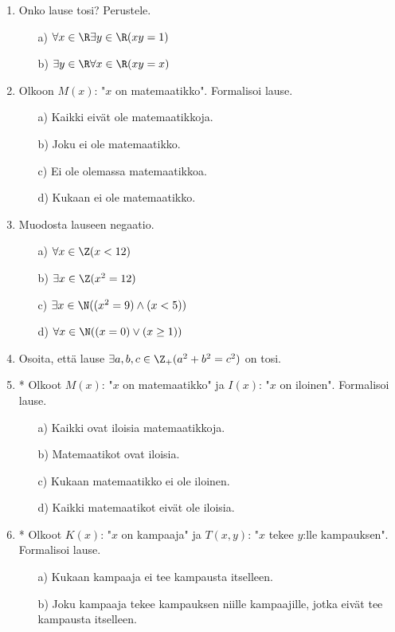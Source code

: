 \begin{enumerate}
\item Onko lause tosi? Perustele.
\begin{itemize}
\item[a)] $\forall x\in \R\exists y\in \R (xy=1)$
\item[b)] $\exists y\in \R\forall x\in \R (xy =x)$
\end{itemize}

\item Olkoon $M(x)$: "$x$ on matemaatikko". Formalisoi lause.

\begin{itemize}
\item[a)] Kaikki eivät ole matemaatikkoja.
\item[b)] Joku ei ole matemaatikko.
\item[c)] Ei ole olemassa matemaatikkoa.
\item[d)] Kukaan ei ole matemaatikko.
\end{itemize}

\item
Muodosta lauseen negaatio.
\begin{itemize}
\item[a)] $\forall x\in \Z (x < 12)$
\item[b)] $\exists x\in \Z (x^2 = 12)$
\item[c)] $\exists x\in \N ((x^2=9) \land (x<5))$
\item[d)] $\forall x\in \N ((x=0)\lor (x\ge 1))$
\end{itemize}

\item Osoita, että lause $\exists a,b,c \in \Z_{+} (a^2 + b^2 =
c^2)$ on tosi.

\item * %
Olkoot $M(x)$: "$x$ on matemaatikko" ja
$I(x)$: "$x$ on iloinen". Formalisoi lause.
\begin{itemize}
\item[a)] Kaikki ovat iloisia matemaatikkoja.
\item[b)] Matemaatikot ovat iloisia.
\item[c)] Kukaan matemaatikko ei ole iloinen.
\item[d)] Kaikki matemaatikot eivät ole iloisia.
\end{itemize}

\item * %
Olkoot $K(x)$: "$x$ on kampaaja" ja
$T(x,y)$: "$x$ tekee $y$:lle kampauksen". Formalisoi lause.
\begin{itemize}
\item[a)] Kukaan kampaaja ei tee kampausta itselleen.
\item[b)] Joku kampaaja tekee kampauksen niille kampaajille,
jotka eivät tee kampausta itselleen.
\end{itemize}

\end{enumerate}

